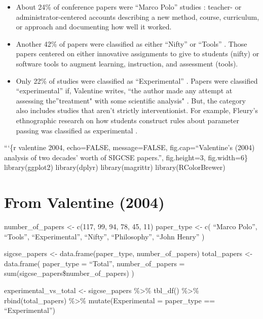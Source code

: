 \begin{itemize}
\tightlist
\item
  About 24\% of conference papers were ``Marco Polo'' studies \citep[ p.~256]{valentine_cs_2004}: teacher- or administrator-centered accounts describing a new method, course, curriculum, or approach and documenting how well it worked.
\item
  Another 42\% of papers were classified as either ``Nifty'' or ``Tools'' \citep[ p.~257]{valentine_cs_2004}. Those papers centered on either innovative assignments to give to students (nifty) or software tools to augment learning, instruction, and assessment (tools).
\item
  Only 22\% of studies were classified as ``Experimental'' \citep[ pp.~256-257]{valentine_cs_2004}. Papers were classified ``experimental'' if, Valentine writes, ``the author made any attempt at assessing the''treatment" with some scientific analysis" \citeyearpar[ p.~256]{valentine_cs_2004}. But, the category also includes studies that aren't strictly interventionist. For example, Fleury's \citeyearpar{fleury_parameter_1991} ethnographic research on how students construct rules about parameter passing was classified as experimental \citep[ p.~256]{valentine_cs_2004}.
\end{itemize}

```\{r valentine 2004, echo=FALSE, message=FALSE, fig.cap=``Valentine's (2004) analysis of two decades' worth of SIGCSE papers.'', fig.height=3, fig.width=6\} library(ggplot2) library(dplyr) library(magrittr) library(RColorBrewer)

\section{From Valentine (2004)}\label{from-valentine-2004}

number\_of\_papers \textless{}- c(117, 99, 94, 78, 45, 11) paper\_type \textless{}- c( ``Marco Polo'', ``Tools'', ``Experimental'', ``Nifty'', ``Philosophy'', ``John Henry'' )

sigcse\_papers \textless{}- data.frame(paper\_type, number\_of\_papers) total\_papers \textless{}- data.frame( paper\_type = ``Total'', number\_of\_papers = sum(sigcse\_papers\$number\_of\_papers) )

experimental\_vs\_total \textless{}- sigcse\_papers \%\textgreater{}\% tbl\_df() \%\textgreater{}\% rbind(total\_papers) \%\textgreater{}\% mutate(Experimental = paper\_type == ``Experimental'')

